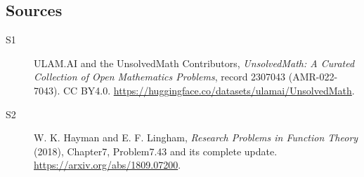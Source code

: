\documentclass[11pt]{article}
\begin{document}
\subsection{Sources}
\begin{description}
\item[\hypertarget{source:2307043:1}{S1}] ULAM.AI and the UnsolvedMath Contributors, \emph{UnsolvedMath: A Curated Collection of Open Mathematics Problems}, record 2307043 (AMR-022-7043). CC BY4.0. \url{https://huggingface.co/datasets/ulamai/UnsolvedMath}.
\item[\hypertarget{source:2307043:2}{S2}] W. K. Hayman and E. F. Lingham, \emph{Research Problems in Function Theory} (2018), Chapter7, Problem7.43 and its complete update. \url{https://arxiv.org/abs/1809.07200}.
\end{description}
\label{end:2307043}
\end{document}
